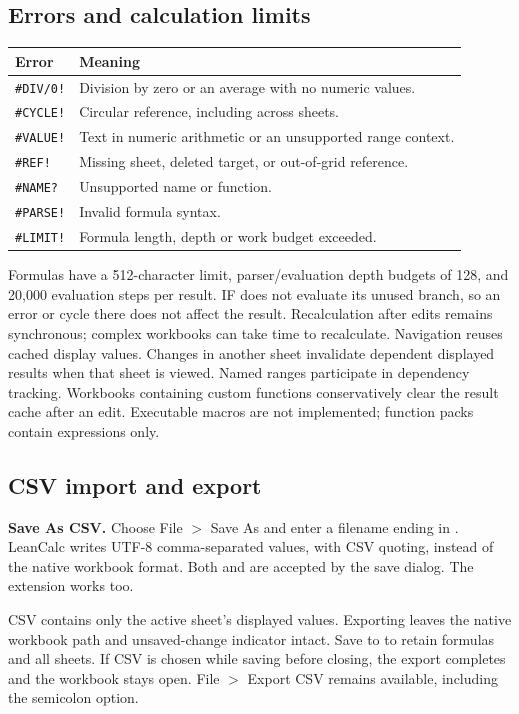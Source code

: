 \documentclass[11pt,letterpaper]{article}
\newcommand{\code}[1]{\texttt{\detokenize{#1}}}
\begin{document}
\subsection{Errors and calculation limits}
\begin{center}\small
\begin{tabular}{@{}ll@{}}
\toprule\textbf{Error} & \textbf{Meaning}\\\midrule
\texttt{\#DIV/0!} & Division by zero or an average with no numeric values.\\
\texttt{\#CYCLE!} & Circular reference, including across sheets.\\
\texttt{\#VALUE!} & Text in numeric arithmetic or an unsupported range context.\\
\texttt{\#REF!} & Missing sheet, deleted target, or out-of-grid reference.\\
\texttt{\#NAME?} & Unsupported name or function.\\
\texttt{\#PARSE!} & Invalid formula syntax.\\
\texttt{\#LIMIT!} & Formula length, depth or work budget exceeded.\\
\bottomrule
\end{tabular}\end{center}
Formulas have a 512-character limit, parser/evaluation depth budgets of 128, and
20,000 evaluation steps per result. IF does not evaluate its unused branch, so an
error or cycle there does not affect the result. Recalculation after edits remains
synchronous; complex workbooks can take time to recalculate. Navigation reuses
cached display values. Changes in another sheet invalidate dependent displayed
results when that sheet is viewed. Named ranges participate in dependency tracking.
Workbooks containing custom functions conservatively clear the result cache after
an edit. Executable macros are not implemented; function packs contain expressions only.

\subsection{CSV import and export}
\textbf{Save As CSV.} Choose File $>$ Save As and enter a filename ending in
\code{.csv}. LeanCalc writes UTF-8 comma-separated values, with CSV quoting,
instead of the native workbook format. Both \code{.csv} and \code{.lcalc} are
accepted by the save dialog. The \code{.CSV} extension works too.

CSV contains only the active sheet's displayed values. Exporting leaves the
native workbook path and unsaved-change indicator intact. Save to \code{.lcalc}
to retain formulas and all sheets. If CSV is chosen while saving before closing,
the export completes and the workbook stays open. File $>$ Export CSV remains
available, including the semicolon option.
\end{document}
